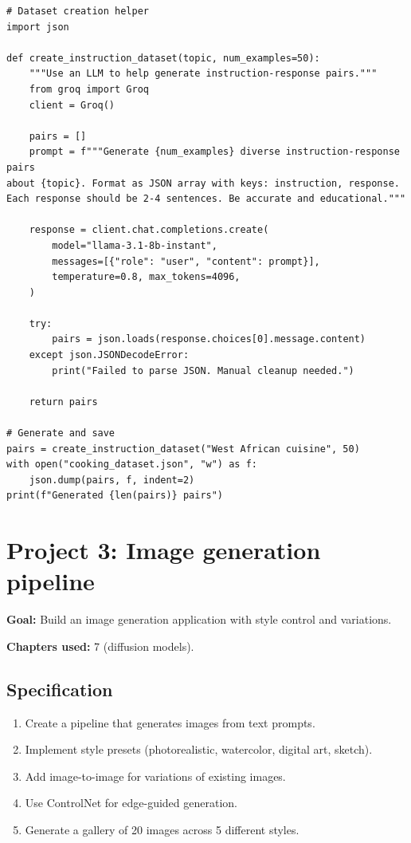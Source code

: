 \begin{verbatim}
# Dataset creation helper
import json

def create_instruction_dataset(topic, num_examples=50):
    """Use an LLM to help generate instruction-response pairs."""
    from groq import Groq
    client = Groq()

    pairs = []
    prompt = f"""Generate {num_examples} diverse instruction-response pairs
about {topic}. Format as JSON array with keys: instruction, response.
Each response should be 2-4 sentences. Be accurate and educational."""

    response = client.chat.completions.create(
        model="llama-3.1-8b-instant",
        messages=[{"role": "user", "content": prompt}],
        temperature=0.8, max_tokens=4096,
    )

    try:
        pairs = json.loads(response.choices[0].message.content)
    except json.JSONDecodeError:
        print("Failed to parse JSON. Manual cleanup needed.")

    return pairs

# Generate and save
pairs = create_instruction_dataset("West African cuisine", 50)
with open("cooking_dataset.json", "w") as f:
    json.dump(pairs, f, indent=2)
print(f"Generated {len(pairs)} pairs")
\end{verbatim}

\section{Project 3: Image generation pipeline}

\textbf{Goal:} Build an image generation application with style control and variations.

\textbf{Chapters used:} 7 (diffusion models).

\subsection{Specification}

\begin{enumerate}
  \item Create a pipeline that generates images from text prompts.
  \item Implement style presets (photorealistic, watercolor, digital art, sketch).
  \item Add image-to-image for variations of existing images.
  \item Use ControlNet for edge-guided generation.
  \item Generate a gallery of 20 images across 5 different styles.
\end{enumerate}

